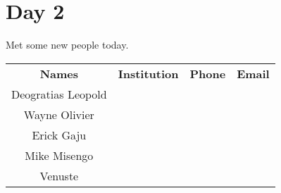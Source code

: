 \section{Day 2}
Met some new people today.
\begin{tabular}{|c|c|c|c|}
	\textbf{Names} & \textbf{Institution} & \textbf{Phone} & \textbf{Email} \\
	Deogratias Leopold &  & & \\
	Wayne Olivier & & & \\
	Erick Gaju & & & \\
	Mike Misengo & & & \\
	Venuste & & & \\
	
	
\end{tabular}
